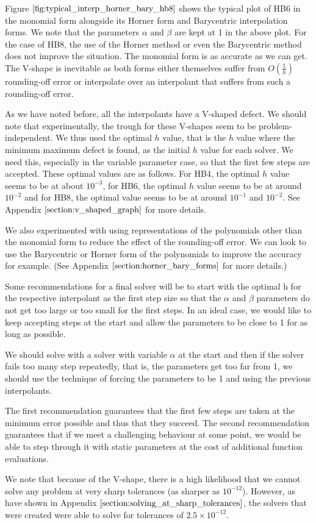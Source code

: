 Figure $\ref{fig:typical_interp_horner_bary_hb8}$ shows the typical plot of HB6 in the monomial form alongside its Horner form and Barycentric interpolation forms. We note that the parameters $\alpha$ and $\beta$ are kept at 1 in the above plot. For the case of HB8, the use of the Horner method or even the Barycentric method does not improve the situation. The monomial form is as accurate as we can get. The V-shape is inevitable as both forms either themselves suffer from $O(\frac{1}{h})$ rounding-off error or interpolate over an interpolant that suffers from such a rounding-off error.

\label{section:defect_final_recommendations}
As we have noted before, all the interpolants have a V-shaped defect. We should note that experimentally, the trough for these V-shapes seem to be problem-independent. We thus used the optimal $h$ value, that is the $h$ value where the minimum maximum defect is found, as the initial $h$ value for each solver. We need this, especially in the variable parameter case, so that the first few steps are accepted. These optimal values are as follows. For HB4, the optimal $h$ value seems to be at about $10^{-3}$, for HB6, the optimal $h$ value seems to be at around $10^{-2}$ and for HB8, the optimal value seems to be at around $10^{-1}$ and $10^{-2}$. See Appendix $\ref{section:v_shaped_graph}$ for more details.

We also experimented with using representations of the polynomials other than the monomial form to reduce the effect of the rounding-off error. We can look to use the Barycentric or Horner form of the polynomials to improve the accuracy for example. (See Appendix $\ref{section:horner_bary_forms}$ for more details.)

Some recommendations for a final solver will be to start with the optimal h for the respective interpolant as the first step size so that the $\alpha$ and $\beta$ parameters do not get too large or too small for the first steps. In an ideal case, we would like to keep accepting steps at the start and allow the parameters to be close to 1 for as long as possible.

We should solve with a solver with variable $\alpha$ at the start and then if the solver fails too many step repeatedly, that is, the parameters get too far from 1, we should use the technique of forcing the parameters to be 1 and using the previous interpolants.

The first recommendation guarantees that the first few steps are taken at the minimum error possible and thus that they succeed. The second recommendation guarantees that if we meet a challenging behaviour at some point, we would be able to step through it with static parameters at the cost of additional function evaluations.

We note that because of the V-shape, there is a high likelihood that we cannot solve any problem at very sharp tolerances (as sharper as $10^{-12}$). However, as have shown in Appendix $\ref{section:solving_at_sharp_tolerances}$, the solvers that were created were able to solve for tolerances of $2.5 \times 10^{-12}$.
